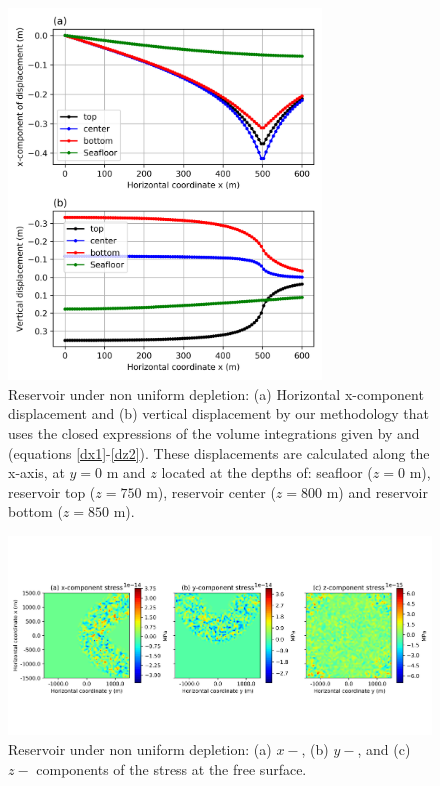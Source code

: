 \documentclass[journal abbreviation, manuscript]{copernicus}
\begin{document}
\begin{figure}[h]
\includegraphics[width=8.3cm]{Fig/Figure_Displacement_z_levels_non_uniform_depletion.png}
\caption{Reservoir under non uniform depletion: (a) Horizontal x-component displacement and (b) vertical displacement by our methodology that uses the closed expressions of the volume integrations given by \cite{Nagyetal2000} and \cite{Nagyetal2002} (equations \ref{dx1}-\ref{dz2}).
These displacements are calculated along the x-axis, at $y = 0$ m and $z$ located at the depths of:  seafloor ($z = 0$ m), reservoir top ($z = 750$ m), reservoir center ($z = 800$ m) and reservoir bottom ($z = 850$ m).}
\label{fig:displacement_z_levels_non_uniform_depletion}
\end{figure}


\begin{figure}[h]
\includegraphics[width=12cm]{Fig/Figure_Null_stress_non_uniform_depletion.png}
\caption{Reservoir under non uniform depletion: (a) $x-$, (b) $y-$, and (c) $z-$ components of the stress at the free surface.}
\label{fig:Null_stress_non_uniform_depletion}
\end{figure}
\end{document}
